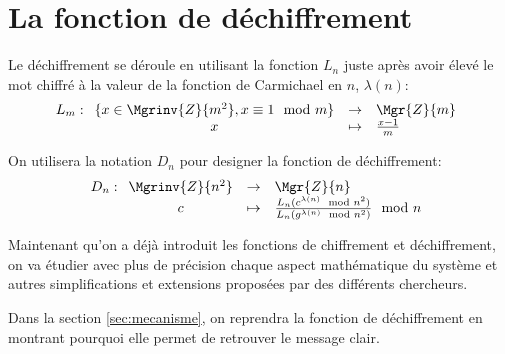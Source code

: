 	\section{La fonction de déchiffrement}
		\label{section:dech}
		Le déchiffrement se déroule en utilisant la fonction $L_{n}$ 
		juste après avoir élevé le mot chiffré à la valeur de la fonction de Carmichael 
		en $n$, $\lambda(n)$: %
		\begin{equation}
			L_{m} : \begin{array}[t]{ccl} \{x \in \Mgrinv{Z}{m^2}, x \equiv 1\mod{m}\} &\rightarrow &   \Mgr{Z}{m}  \\
				x&\mapsto& \frac{x-1}{m}
			 \end{array}
		\end{equation}

		\begin{definition} On utilisera la notation $D_n$ pour designer la fonction de dé\-chif\-fre\-ment:
			\begin{equation}
				D_n : \begin{array}[t]{ccl} \Mgrinv{Z}{n^2} &\rightarrow &   \Mgr{Z}{n}  \\
					c&\mapsto& \frac{L_n(c^{\lambda(n)}\mod{n^2})}{L_n(g^{\lambda(n)}\mod{n^2})}\mod{n}
				\end{array}
			\end{equation}
		\end{definition}



		Maintenant qu'on a déjà introduit les fonctions de chiffrement et dé\-chiffre\-ment, on va étudier avec plus de précision chaque aspect 
		ma\-thé\-ma\-ti\-que du système et autres simplifications et extensions proposées par des différents chercheurs.

		Dans la section \ref{sec:mecanisme}, on reprendra la fonction de déchiffrement en montrant pourquoi elle permet de retrouver 
		le message clair. %


